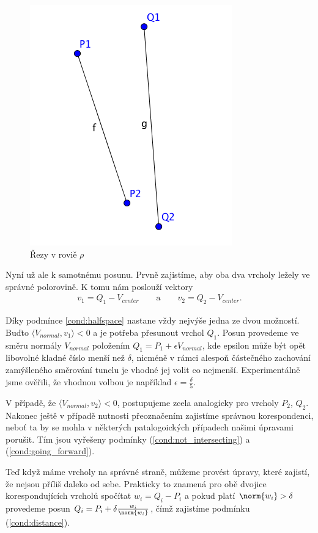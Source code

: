 \begin{figure}[ht]
    \centering
    \includegraphics{img/segments_basic.png}
    \caption{Řezy v roviě $ \rho $}
  \centering
  \label{fig:segments_basic}
\end{figure}

Nyní už ale k samotnému posunu. Prvně zajistíme, aby oba dva vrcholy ležely ve
správné polorovině. K tomu nám poslouží vektory
\begin{align*}
    v_1 = Q_1 - V_{center} \qquad\text{a}\qquad v_2 = Q_2 - V_{center}.
\end{align*}

Díky podmínce \ref{cond:halfspace} nastane vždy nejvýše jedna
ze dvou možností. Buďto $ \langle V_{normal}, v_1\rangle < 0 $ a je potřeba
přesunout vrchol $ Q_1 $. Posun provedeme ve směru normály $ V_{normal} $ položením
$ Q_1 = P_1 + \epsilon V_{normal} $, kde epsilon může být opět libovolné
kladné číslo menší než $ \delta $, nicméně v rámci alespoň částečného zachování
zamýšleného směrování tunelu je vhodné jej volit co nejmenší. Experimentálně
jsme ověřili, že vhodnou volbou je například $ \epsilon = \frac{\delta}{5} $.

V případě, že $ \langle V_{normal}, v_2\rangle < 0 $, postupujeme zcela analogicky
pro vrcholy $ P_2 $, $ Q_2 $. Nakonec ještě v případě nutnosti přeoznačením
zajistíme správnou korespondenci, neboť ta by se mohla v některých patalogoických
případech našimi úpravami porušit. Tím jsou vyřešeny podmínky
(\ref{cond:not_intersecting}) a (\ref{cond:going_forward}).

Teď když máme vrcholy na správné straně, můžeme provést úpravy, které zajistí,
že nejsou příliš daleko od sebe. Prakticky to znamená pro obě dvojice
korespondujících vrcholů spočítat $ w_i = Q_i - P_i $ a pokud platí
$ \norm{w_i} > \delta $ provedeme posun
$ Q_i = P_i + \delta \frac{w_i}{\norm{w_i}} $, čímž zajistíme podmínku
(\ref{cond:distance}).

